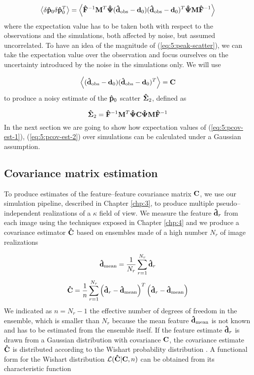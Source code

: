 \begin{equation}
\label{eq:5:peak-scatter}
\left\langle\delta\mathbf{\hat{p}}_0\delta\mathbf{\hat{p}}_0^T\right\rangle = \left\langle\mathbf{\hat{F}}^{-1}\mathbf{M}^T\mathbf{\hat{\Psi}}(\mathbf{\hat{d}}_{\rm obs}-\mathbf{d}_0)(\mathbf{\hat{d}}_{\rm obs}-\mathbf{d}_0)^T\mathbf{\hat{\Psi}}\mathbf{M}\mathbf{\hat{F}}^{-1}\right\rangle
\end{equation}
%
where the expectation value has to be taken both with respect to the observations and the simulations, both affected by noise, but assumed uncorrelated. To have an idea of the magnitude of (\ref{eq:5:peak-scatter}), we can take the expectation value over the observation and focus ourselves on the uncertainty introduced by the noise in the simulations only. We will use 

\begin{equation}
\label{eq:5:expobs}
\left\langle(\mathbf{\hat{d}}_{\rm obs}-\mathbf{d}_0)(\mathbf{\hat{d}}_{\rm obs}-\mathbf{d}_0)^T\right\rangle = \mathbf{C}
\end{equation}
%
to produce a noisy estimate of the $\mathbf{\hat{p}}_0$ scatter $\mathbf{\hat{\Sigma}}_2$, defined as 

\begin{equation}
\label{eq:5:pcov-est-2}
\mathbf{\hat{\Sigma}}_2 = \mathbf{\hat{F}}^{-1}\mathbf{M}^T\mathbf{\hat{\Psi}}\mathbf{C}\mathbf{\hat{\Psi}}\mathbf{M}\mathbf{\hat{F}}^{-1} 
\end{equation} 
%
In the next section we are going to show how expectation values of (\ref{eq:5:pcov-est-1}), (\ref{eq:5:pcov-est-2}) over simulations can be calculated under a Gaussian assumption.    

\subsection{Covariance matrix estimation}
To produce estimates of the feature--feature covariance matrix $\mathbf{C}$, we use our simulation pipeline, described in Chapter \ref{chp:3}, to produce multiple pseudo--independent realizations of a $\kappa$ field of view. We measure the feature $\mathbf{\hat{d}}_r$ from each image using the techniques exposed in Chapter \ref{chp:4} and we produce a covariance estimator $\mathbf{\hat{C}}$ based on ensembles made of a high number $N_r$ of image realizations

\begin{equation}
\label{eq:5:meanest-sim}
\mathbf{\hat{d}}_{\rm mean} = \frac{1}{N_r}\sum_{r=1}^{N_r}\mathbf{\hat{d}}_r 
\end{equation}
%
\begin{equation}
\label{eq:5:covestest-sim}
\mathbf{\hat{C}} = \frac{1}{n}\sum_{r=1}^{N_r}\left(\mathbf{\hat{d}}_r-\mathbf{\hat{d}}_{\rm mean}\right)^T\left(\mathbf{\hat{d}}_r-\mathbf{\hat{d}}_{\rm mean}\right) 
\end{equation}
%
We indicated as $n=N_r-1$ the effective number of degrees of freedom in the ensemble, which is smaller than $N_r$ because the mean feature $\mathbf{\hat{d}}_{\rm mean}$ is not known and has to be estimated from the ensemble itself. If the feature estimate $\mathbf{\hat{d}}_r$ is drawn from a Gaussian distribution with covariance $\mathbf{C}$, the covariance estimate $\mathbf{\hat{C}}$ is distributed according to the Wishart probability distribution \citep{Taylor12,Taylor14,MasumotoWishart}. A functional form for the Wishart distribution $\mathcal{L}(\mathbf{\hat{C}}\vert\mathbf{C},n)$ can be obtained from its characteristic function 

